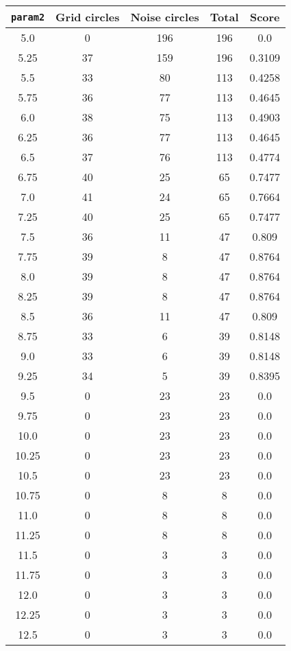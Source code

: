 \documentclass[letterpaper, 12pt]{article}
\begin{document}
\begin{longtable}{|c|c|c|c|c|}
\hline
\textbf{\texttt{param2}} & \textbf{Grid circles} & \textbf{Noise circles} & \textbf{Total} & \textbf{Score} \\
\hline
5.0 & 0 & 196 & 196 & 0.0 \\
\hline
5.25 & 37 & 159 & 196 & 0.3109 \\
\hline
5.5 & 33 & 80 & 113 & 0.4258 \\
\hline
5.75 & 36 & 77 & 113 & 0.4645 \\
\hline
6.0 & 38 & 75 & 113 & 0.4903 \\
\hline
6.25 & 36 & 77 & 113 & 0.4645 \\
\hline
6.5 & 37 & 76 & 113 & 0.4774 \\
\hline
6.75 & 40 & 25 & 65 & 0.7477 \\
\hline
7.0 & 41 & 24 & 65 & 0.7664 \\
\hline
7.25 & 40 & 25 & 65 & 0.7477 \\
\hline
7.5 & 36 & 11 & 47 & 0.809 \\
\hline
7.75 & 39 & 8 & 47 & 0.8764 \\
\hline
8.0 & 39 & 8 & 47 & 0.8764 \\
\hline
8.25 & 39 & 8 & 47 & 0.8764 \\
\hline
8.5 & 36 & 11 & 47 & 0.809 \\
\hline
8.75 & 33 & 6 & 39 & 0.8148 \\
\hline
9.0 & 33 & 6 & 39 & 0.8148 \\
\hline
9.25 & 34 & 5 & 39 & 0.8395 \\
\hline
9.5 & 0 & 23 & 23 & 0.0 \\
\hline
9.75 & 0 & 23 & 23 & 0.0 \\
\hline
10.0 & 0 & 23 & 23 & 0.0 \\
\hline
10.25 & 0 & 23 & 23 & 0.0 \\
\hline
10.5 & 0 & 23 & 23 & 0.0 \\
\hline
10.75 & 0 & 8 & 8 & 0.0 \\
\hline
11.0 & 0 & 8 & 8 & 0.0 \\
\hline
11.25 & 0 & 8 & 8 & 0.0 \\
\hline
11.5 & 0 & 3 & 3 & 0.0 \\
\hline
11.75 & 0 & 3 & 3 & 0.0 \\
\hline
12.0 & 0 & 3 & 3 & 0.0 \\
\hline
12.25 & 0 & 3 & 3 & 0.0 \\
\hline
12.5 & 0 & 3 & 3 & 0.0 \\

\end{longtable}
\end{document}
